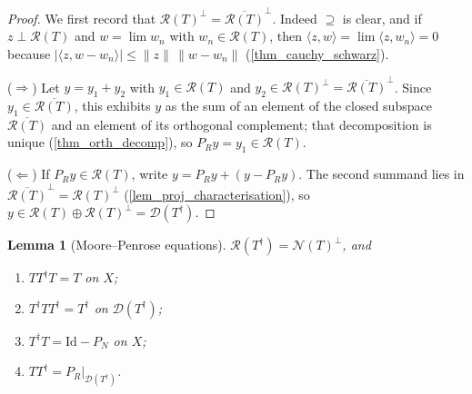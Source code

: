 \documentclass[a4paper]{report}
\theoremstyle{plain}
\newtheorem{lemma}[theorem]{Lemma}
\theoremstyle{definition}
\theoremstyle{remark}
\newcommand{\Ran}{\mathcal{R}}
\newcommand{\Ker}{\mathcal{N}}
\newcommand{\Dom}{\mathcal{D}}
\newcommand{\Id}{\mathrm{Id}}
\newcommand{\dg}{^{\dagger}}
\begin{document}
\begin{proof}
  We first record that $\Ran(T)^{\perp} = \overline{\Ran(T)}^{\perp}$.  Indeed
  $\supseteq$ is clear, and if $z \perp \Ran(T)$ and $w = \lim w_n$ with
  $w_n \in \Ran(T)$, then $\langle z, w\rangle = \lim \langle z, w_n\rangle = 0$ because
  $|\langle z, w - w_n\rangle| \le \|z\|\,\|w - w_n\|$ (\cref{thm_cauchy_schwarz}).

  ($\Rightarrow$)  Let $y = y_1 + y_2$ with $y_1 \in \Ran(T)$ and
  $y_2 \in \Ran(T)^{\perp} = \overline{\Ran(T)}^{\perp}$.  Since
  $y_1 \in \overline{\Ran(T)}$, this exhibits $y$ as the sum of an element of the closed
  subspace $\overline{\Ran(T)}$ and an element of its orthogonal complement; that
  decomposition is unique (\cref{thm_orth_decomp}), so $P_Ry = y_1 \in \Ran(T)$.

  ($\Leftarrow$)  If $P_Ry \in \Ran(T)$, write $y = P_Ry + (y - P_Ry)$.  The second summand
  lies in $\overline{\Ran(T)}^{\perp} = \Ran(T)^{\perp}$ (\cref{lem_proj_characterisation}),
  so $y \in \Ran(T) \oplus \Ran(T)^{\perp} = \Dom(T\dg)$.
\end{proof}


\begin{lemma}[Moore--Penrose equations]
  \label{lem_mp_equations}
  $\Ran(T\dg) = \Ker(T)^{\perp}$, and
  \begin{enumerate}
    \item $T T\dg T = T$ on $X$;
    \item $T\dg T T\dg = T\dg$ on $\Dom(T\dg)$;
    \item $T\dg T = \Id - P_N$ on $X$;
    \item $T T\dg = P_R|_{\Dom(T\dg)}$.
  \end{enumerate}
\end{lemma}
\end{document}
